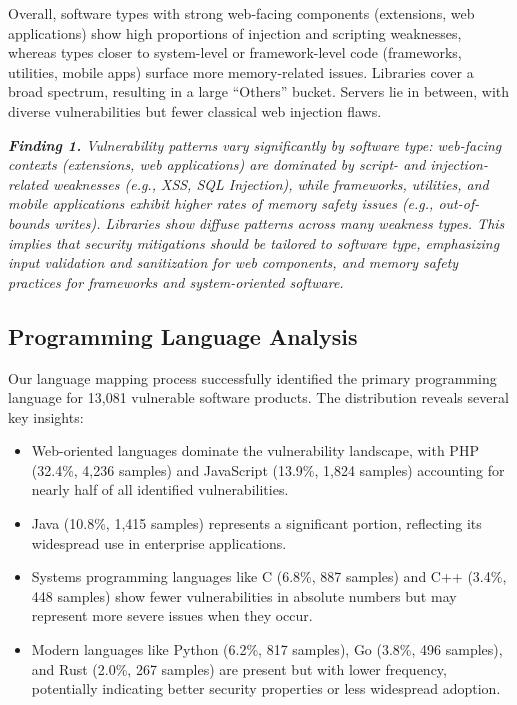 Overall, software types with strong web-facing components (extensions, web applications) show high proportions of injection and scripting weaknesses, whereas types closer to system-level or framework-level code (frameworks, utilities, mobile apps) surface more memory-related issues. Libraries cover a broad spectrum, resulting in a large “Others” bucket. Servers lie in between, with diverse vulnerabilities but fewer classical web injection flaws.

\begin{boxC}
\textit{\textbf{Finding 1.} Vulnerability patterns vary significantly by software type: web-facing contexts (extensions, web applications) are dominated by script- and injection-related weaknesses (e.g., XSS, SQL Injection), while frameworks, utilities, and mobile applications exhibit higher rates of memory safety issues (e.g., out-of-bounds writes). Libraries show diffuse patterns across many weakness types. This implies that security mitigations should be tailored to software type, emphasizing input validation and sanitization for web components, and memory safety practices for frameworks and system-oriented software.}
\end{boxC}

\subsection{Programming Language Analysis}

Our language mapping process successfully identified the primary programming language for 13,081 vulnerable software products. The distribution reveals several key insights:

\begin{itemize}
    \item Web-oriented languages dominate the vulnerability landscape, with PHP (32.4\%, 4,236 samples) and JavaScript (13.9\%, 1,824 samples) accounting for nearly half of all identified vulnerabilities.
    \item Java (10.8\%, 1,415 samples) represents a significant portion, reflecting its widespread use in enterprise applications.
    \item Systems programming languages like C (6.8\%, 887 samples) and C++ (3.4\%, 448 samples) show fewer vulnerabilities in absolute numbers but may represent more severe issues when they occur.
    \item Modern languages like Python (6.2\%, 817 samples), Go (3.8\%, 496 samples), and Rust (2.0\%, 267 samples) are present but with lower frequency, potentially indicating better security properties or less widespread adoption.
\end{itemize}

